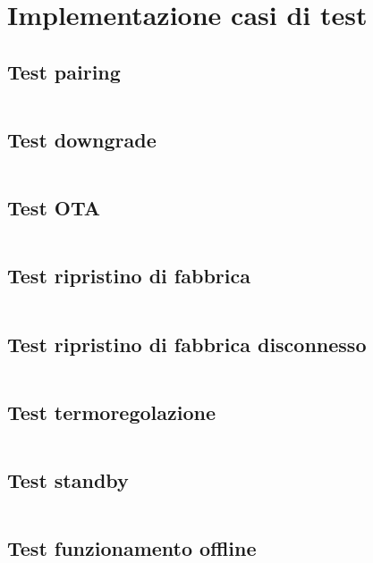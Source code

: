 \documentclass[12pt,a4paper,twoside,titlepage]{book}
\begin{document}
\appendix

\chapter{Implementazione casi di test}
\section{Test pairing}
\label{section:impl_test_pairing}
\inputminted[]{python3}{src/test_pairing.py}

\section{Test downgrade}
\label{section:impl_test_downgrade}
\inputminted[]{python3}{src/test_downgrade.py}

\section{Test OTA}
\label{section:impl_test_ota}
\inputminted[]{python3}{src/test_ota.py}

\section{Test ripristino di fabbrica}
\label{section:impl_test_factory_reset}
\inputminted[]{python3}{src/test_factory_reset.py}

\section{Test ripristino di fabbrica disconnesso}
\label{section:impl_test_factory_reset_offline}
\inputminted[]{python3}{src/test_factory_reset_offline.py}

\section{Test termoregolazione}
\label{section:impl_test_thermoregulation}
\inputminted[]{python3}{src/test_thermoregulation.py}

\section{Test standby}
\label{section:impl_test_standby}
\inputminted[]{python3}{src/test_standby.py}

\section{Test funzionamento offline}
\label{section:impl_test_offline_working}
\inputminted[]{python3}{src/test_offline_working.py}

\clearpage

\printglossary
\printglossary[type=\acronymtype]
\end{document}
